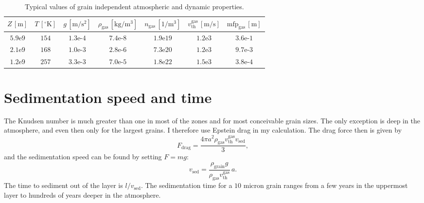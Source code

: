 \documentclass[aps,pra,preprint]{revtex4-2}
\theoremstyle{definition}
\newcommand{\rom}[1]{\mathrm{#1}} %
\begin{document}
\begin{table}
\caption{\label{tab:values1}Typical values of grain independent atmospheric and
dynamic properties.}
\begin{ruledtabular}
\begin{tabular}{ccccccc}
$Z\,[\rom{m}]$ & $T\,[\rom{^\circ{K}}]$ & $g\,[\rom{m/s^2}]$ &
$\rho_\text{gas}\,[\rom{kg/m^3}]$ & $n_\text{gas}\,[\rom{1/m^3}]$ &
$v_\text{th}^\text{gas}\,[\rom{m/s}]$ & $\text{mfp}_\text{gas}\,[\rom{m}]$ \\
\hline
$5.9\text{e9}$ & $154$ & $1.3\text{e-4}$ & $7.4\text{e-8}$ & $1.9\text{e19}$ &
$1.2\text{e3}$ & $3.6\text{e-1}$ \\ $2.1\text{e9}$ & $168$ & $1.0\text{e-3}$ &
$2.8\text{e-6}$ & $7.3\text{e20}$ & $1.2\text{e3}$ & $9.7\text{e-3}$ \\
$1.2\text{e9}$ & $257$ & $3.3\text{e-3}$ & $7.0\text{e-5}$ & $1.8\text{e22}$ &
$1.5\text{e3}$ & $3.8\text{e-4}$
\end{tabular}
\end{ruledtabular}
\end{table}

\section*{Sedimentation speed and time}
The Knudsen number is much greater than one in most of the zones and for most
conceivable grain sizes. The only exception is deep in the atmosphere, and even
then only for the largest grains. I therefore use Epstein drag in my
calculation. The drag force then is given by
\begin{equation}
F_\text{drag} = 
\frac{4\pi{a}^2\rho_\text{gas}v_\text{th}^\text{gas}v_\text{sed}}{3},
\end{equation}
and the sedimentation speed can be found by setting $F=mg$:
\begin{equation}
v_\text{sed} = 
\frac{\rho_\text{grain}g}{\rho_\text{gas}v_\text{th}^\text{gas}}\,a.
\end{equation}
The time to sediment out of the layer is $l/v_\text{sed}$. The sedimentation
time for a $10$ micron grain ranges from a few years in the uppermost layer to
hundreds of years deeper in the atmosphere.
\end{document}

